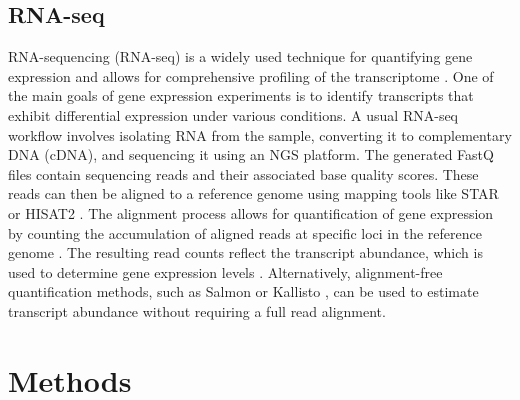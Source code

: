 \documentclass[12pt]{article}
\begin{document}
\subsection{RNA-seq}
RNA-sequencing (RNA-seq) is a widely used technique for quantifying gene expression and allows for comprehensive profiling of the transcriptome \cite{Kukurba2015}.
One of the main goals of gene expression experiments is to identify transcripts that exhibit differential expression under various conditions.
A usual RNA-seq workflow involves isolating RNA from the sample, converting it to complementary DNA (cDNA), and sequencing it using an NGS platform.
The generated FastQ files contain sequencing reads and their associated base quality scores. These reads can then be aligned to a reference genome using mapping tools like STAR \cite{Dobin2012} or HISAT2 \cite{Kim2019}.
The alignment process allows for quantification of gene expression by counting the accumulation of aligned reads at specific loci in the reference genome \cite{Kukurba2015}. The resulting read counts reflect the transcript abundance, which is used to determine gene expression levels \cite{Kukurba2015}.
Alternatively, alignment-free quantification methods, such as Salmon \cite{Patro2017} or Kallisto \cite{Bray2016}, can be used to estimate transcript abundance without requiring a full read alignment.

\section{Methods}
\end{document}
